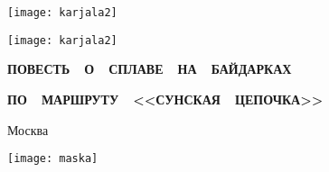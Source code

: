 \begin{titlepage}
	\newpage
	\begin{center}
		\Large \textbf \MyVarAuthorName
	\end{center}	
	\vspace{0.75cm}	
	\begin{center}
	\texttt{[image: karjala2]}%
	\end{center}	
	\begin{center}
		\Huge{}
	\end{center}	
%
	\begin{center}
	\texttt{[image: karjala2]}%
	\end{center}
%
	\begin{center}
		\footnotesize
%	
		{
		\textbf{ПОВЕСТЬ~~О~~СПЛАВЕ~~НА~~БАЙДАРКАХ}}
		
		{
		\textbf{ПО~~МАРШРУТУ~~<<СУНСКАЯ~~ЦЕПОЧКА>>}}		
	\end{center}
%
	\vspace{\fill}	
	\begin{center}\normalsize Москва\end{center}
	\vspace{-1.1cm}
	\begin{center}\texttt{[image: maska]}\end{center}
	\vspace{-1.24cm}
	\begin{center}\normalsize \year\end{center}		
	\begin{flushleft}%
		\textbf{%
		}
	\end{flushleft}%
\end{titlepage}